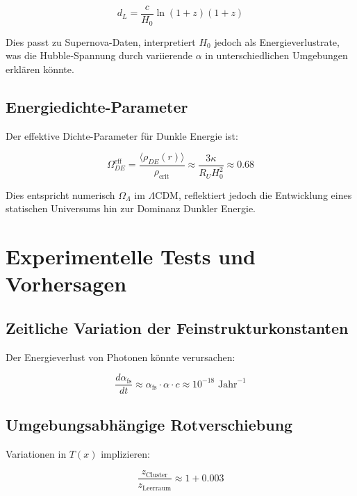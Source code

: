 \documentclass[a4paper,12pt]{article}
\theoremstyle{definition}
\theoremstyle{remark}
\newcommand{\Tfield}{T(x)} %
\begin{document}
	\begin{equation}
		d_L = \frac{c}{H_0} \ln(1+z) (1+z)
	\end{equation}
	
	Dies passt zu Supernova-Daten, interpretiert \(H_0\) jedoch als Energieverlustrate, was die Hubble-Spannung durch variierende \(\alpha\) in unterschiedlichen Umgebungen erklären könnte.
	
	\subsection{Energiedichte-Parameter}
	
	Der effektive Dichte-Parameter für Dunkle Energie ist:
	
	\begin{equation}
		\Omega_{DE}^{\text{eff}} = \frac{\langle\rho_{DE}(r)\rangle}{\rho_{\text{crit}}} \approx \frac{3\kappa}{R_U H_0^2} \approx 0.68
	\end{equation}
	
	Dies entspricht numerisch \(\Omega_{\Lambda}\) im \(\Lambda\)CDM, reflektiert jedoch die Entwicklung eines statischen Universums hin zur Dominanz Dunkler Energie.
	
	\section{Experimentelle Tests und Vorhersagen}
	
	\subsection{Zeitliche Variation der Feinstrukturkonstanten}
	
	Der Energieverlust von Photonen könnte verursachen:
	
	\begin{equation}
		\frac{d\alpha_{\text{fs}}}{dt} \approx \alpha_{\text{fs}} \cdot \alpha \cdot c \approx 10^{-18} \text{ Jahr}^{-1}
	\end{equation}
	
	\subsection{Umgebungsabhängige Rotverschiebung}
	
	Variationen in \(\Tfield\) implizieren:
	
	\begin{equation}
		\frac{z_{\text{Cluster}}}{z_{\text{Leerraum}}} \approx 1 + 0.003
	\end{equation}
	
\end{document}
